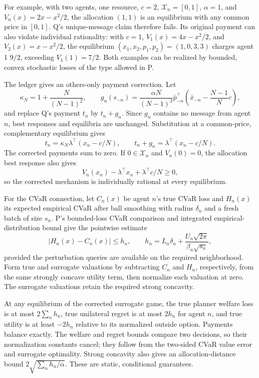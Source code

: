 \documentclass{article}
\begin{document}
For example, with two agents, one resource, \(c=2\), \(\mathcal X_n=[0,1]\), \(\alpha=1\), and \(V_n(x)=2x-x^2/2\), the allocation \((1,1)\) is an equilibrium with any common price in \([0,1]\). Q's unique-message claim therefore fails. Its original payment can also violate individual rationality: with \(c=1\), \(V_1(x)=4x-x^2/2\), and \(V_2(x)=x-x^2/2\), the equilibrium \((x_1,x_2,p_1,p_2)=(1,0,3,3)\) charges agent 1 \(9/2\), exceeding \(V_1(1)=7/2\). Both examples can be realized by bounded, convex stochastic losses of the type allowed in P. 

The ledger gives an others-only payment correction. Let
\[
\kappa_N=1+\frac{N}{(N-1)^2},
\qquad
g_n(s_{-n})=
\frac{\alpha N}{(N-1)^3}
\bar p_{-n}^{\top}
\left(\bar x_{-n}-\frac{N-1}{N}c\right),
\]
and replace Q's payment \(t_n\) by \(t_n+g_n\). Since \(g_n\) contains no message from agent \(n\), best responses and equilibria are unchanged. Substitution at a common-price, complementary equilibrium gives
\[
t_n=\kappa_N\lambda^\top(x_n-c/N),
\qquad
t_n+g_n=\lambda^\top(x_n-c/N).
\]
The corrected payments sum to zero. If \(0\in\mathcal X_n\) and \(V_n(0)=0\), the allocation best response also gives
\[
V_n(x_n)-\lambda^\top x_n+\lambda^\top c/N\geq0,
\]
so the corrected mechanism is individually rational at every equilibrium. 

For the CVaR connection, let \(C_n(x)\) be agent \(n\)'s true CVaR loss and \(H_n(x)\) its expected empirical CVaR after ball smoothing with radius \(\delta_n\) and a fresh batch of size \(s_n\). P's bounded-loss CVaR comparison and integrated empirical-distribution bound give the pointwise estimate
\[
|H_n(x)-C_n(x)|\leq h_n,
\qquad
h_n=L_n\delta_n+
\frac{U_n\sqrt{2\pi}}{\beta_n\sqrt{s_n}},
\]
provided the perturbation queries are available on the required neighborhood. Form true and surrogate valuations by subtracting \(C_n\) and \(H_n\), respectively, from the same strongly concave utility term, then normalize each valuation at zero. The surrogate valuations retain the required strong concavity. 

At any equilibrium of the corrected surrogate game, the true planner welfare loss is at most \(2\sum_nh_n\), true unilateral regret is at most \(2h_n\) for agent \(n\), and true utility is at least \(-2h_n\) relative to its normalized outside option. Payments balance exactly. The welfare and regret bounds compare two decisions, so their normalization constants cancel; they follow from the two-sided CVaR value error and surrogate optimality. Strong concavity also gives an allocation-distance bound \(2\sqrt{\sum_nh_n/\alpha}\). These are static, conditional guarantees. 
\end{document}
